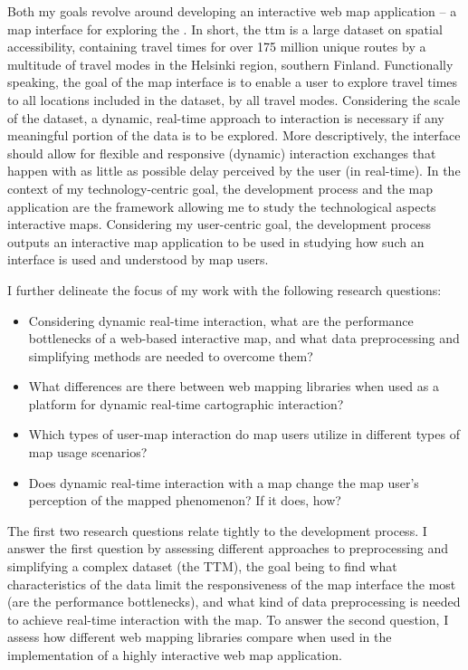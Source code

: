 Both my goals revolve around developing an interactive web map application --
a map interface for exploring the  \parencite{fin2023}.
In short, the \acrshort{ttm} is a large dataset on spatial accessibility,
containing travel times for
over 175 million unique routes by a multitude of travel modes
in the Helsinki region, southern Finland.
Functionally speaking, the goal of the map interface is to enable
a user to explore travel times to all locations included in the dataset,
by all travel modes.
Considering the scale of the dataset,
a dynamic, real-time approach to interaction is necessary
if any meaningful portion of the data is to be explored.
More descriptively, the interface should allow for flexible and
responsive (dynamic) interaction exchanges that happen with as little as possible delay
perceived by the user (in real-time).
In the context of my technology-centric goal,
the development process and the map application are the framework
allowing me to study the technological aspects interactive maps.
Considering my user-centric goal,
the development process outputs an interactive map application
to be used in studying how such an interface is used and understood by map users.

I further delineate the focus of my work with the following research questions:

\begin{itemize}
	\item Considering dynamic real-time interaction,
	what are the performance bottlenecks of
	a web-based interactive map,
	and what data preprocessing and simplifying methods
	are needed to overcome them?
	\item What differences are there between web mapping libraries
	when used as a platform for dynamic real-time cartographic interaction?
	\item Which types of user-map interaction do map users utilize
	in different types of map usage scenarios?
	\item Does dynamic real-time interaction with a map change
	the map user's perception of the mapped phenomenon? If it does, how?
\end{itemize}

The first two research questions relate tightly to the development process.
I answer the first question by assessing different approaches to
preprocessing and simplifying a complex dataset (the TTM),
the goal being to find what characteristics of the data
limit the responsiveness of the map interface the most (are the performance bottlenecks),
and what kind of data preprocessing is needed to achieve real-time interaction with the map.
To answer the second question,
I assess how different web mapping libraries compare when used in the implementation
of a highly interactive web map application.

